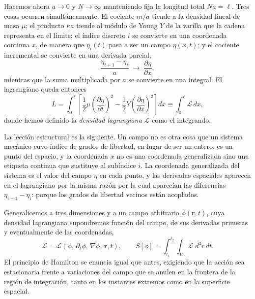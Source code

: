         Hacemos ahora $a\rightarrow 0$ y $N\rightarrow\infty$ manteniendo fija la longitud total $Na = \ell$. Tres cosas ocurren simultáneamente. El cociente $m/a$ tiende a la densidad lineal de masa $\mu$; el producto $\kappa a$ tiende al módulo de Young $Y$ de la varilla que la cadena representa en el límite; el índice discreto $i$ se convierte en una coordenada continua $x$, de manera que $\eta_{i}(t)$ pasa a ser un campo $\eta(x,t)$; y el cociente incremental se convierte en una derivada parcial,
        \begin{equation}\label{eq:LimiteDerivada}
            \frac{\eta_{i+1}-\eta_{i}}{a} \;\longrightarrow\; \frac{\partial\eta}{\partial x},
        \end{equation}
        mientras que la suma multiplicada por $a$ se convierte en una integral. El lagrangiano queda entonces
        \begin{equation}\label{eq:LagrangianoContinuo}
            L = \int_{0}^{\ell}\left[\frac{1}{2}\mu\left(\frac{\partial\eta}{\partial t}\right)^{2} - \frac{1}{2}Y\left(\frac{\partial\eta}{\partial x}\right)^{2}\right]dx \equiv \int_{0}^{\ell}\mathcal{L}\,dx,
        \end{equation}
        donde hemos definido la \textit{densidad lagrangiana} $\mathcal{L}$ como el integrando.

        La lección estructural es la siguiente. Un campo no es otra cosa que un sistema mecánico cuyo índice de grados de libertad, en lugar de ser un entero, es un punto del espacio, y la coordenada $x$ no es una coordenada generalizada sino una etiqueta continua que sustituye al subíndice $i$. La coordenada generalizada del sistema es el valor del campo $\eta$ en cada punto, y las derivadas espaciales aparecen en el lagrangiano por la misma razón por la cual aparecían las diferencias $\eta_{i+1}-\eta_{i}$: porque los grados de libertad vecinos están acoplados.

        Generalicemos a tres dimensiones y a un campo arbitrario $\phi(\mathbf{r},t)$, cuya densidad lagrangiana supondremos función del campo, de sus derivadas primeras y eventualmente de las coordenadas,
        \begin{equation}\label{eq:DensidadLagrangiana}
            \mathcal{L} = \mathcal{L}\left(\phi,\,\partial_{t}\phi,\,\nabla\phi,\,\mathbf{r},t\right),
            \qquad
            S[\phi] = \int_{t_{1}}^{t_{2}}\!\!\int_{V} \mathcal{L}\;d^{3}r\,dt .
        \end{equation}
        El principio de Hamilton se enuncia igual que antes, exigiendo que la acción sea estacionaria frente a variaciones del campo que se anulen en la frontera de la región de integración, tanto en los instantes extremos como en la superficie espacial.

